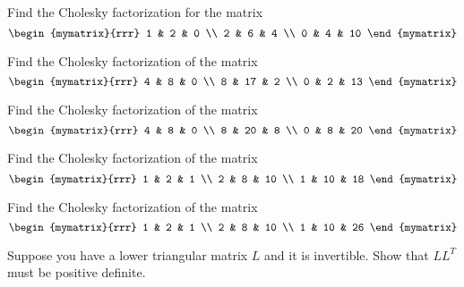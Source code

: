 
\begin{ex} Find the Cholesky factorization for the matrix 
\begin{equation*}
\allowbreak \begin{mymatrix}{rrr}
1 & 2 & 0 \\ 
2 & 6 & 4 \\ 
0 & 4 & 10
\end{mymatrix}
\end{equation*}
\end{ex}

\begin{ex} Find the Cholesky factorization of the matrix 
\begin{equation*}
\begin{mymatrix}{rrr}
4 & 8 & 0 \\ 
8 & 17 & 2 \\ 
0 & 2 & 13
\end{mymatrix}
\end{equation*}
\end{ex}

\begin{ex} Find the Cholesky factorization of the matrix 
\begin{equation*}
\begin{mymatrix}{rrr}
4 & 8 & 0 \\ 
8 & 20 & 8 \\ 
0 & 8 & 20
\end{mymatrix}
\end{equation*}
\end{ex}

\begin{ex} Find the Cholesky factorization of the matrix 
\begin{equation*}
\begin{mymatrix}{rrr}
1 & 2 & 1 \\ 
2 & 8 & 10 \\ 
1 & 10 & 18
\end{mymatrix}
\end{equation*}
\end{ex}

\begin{ex} Find the Cholesky factorization of the matrix 
\begin{equation*}
\begin{mymatrix}{rrr}
1 & 2 & 1 \\ 
2 & 8 & 10 \\ 
1 & 10 & 26
\end{mymatrix}
\end{equation*}
\end{ex}

\begin{ex} Suppose you have a lower triangular matrix $L$ and it is invertible.
Show that $LL^{T}$ must be positive definite.
\end{ex}

